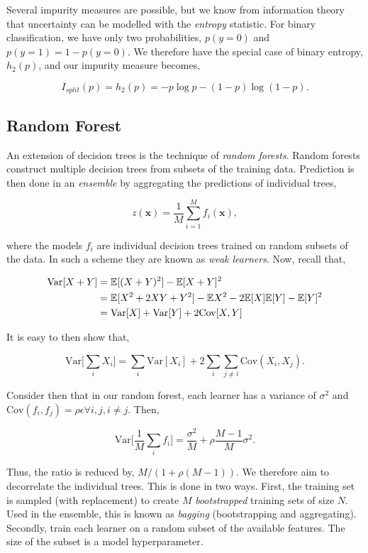 \documentclass[11pt]{amsart}
\begin{document}
Several impurity measures are possible, but we know from information theory that uncertainty can be modelled with the \emph{entropy} statistic. For binary classification, we have only two probabilities, $p(y = 0)$ and $p(y=1) = 1 - p(y=0)$. We therefore have the special case of binary entropy, $h_2(p)$, and our impurity measure becomes,

$$I_{split}(p) = h_2(p) = -p\log p - (1-p)\log (1-p).$$

\subsection{Random Forest}

An extension of decision trees is the technique of \emph{random forests}. Random forests construct multiple decision trees from subsets of the training data. Prediction is then done in an \emph{ensemble} by aggregating the predictions of individual trees,

$$z(\mathbf{x}) = \frac{1}{M}\sum_{i=1}^M f_i(\mathbf{x}),$$

where the models $f_i$ are individual decision trees trained on random subsets of the data. In such a scheme they are known as \emph{weak learners}. Now, recall that,

\begin{align}
\text{Var}[X + Y] &= \mathbb{E}[(X + Y)^2] - \mathbb{E}[X + Y]^2 \notag \\
&= \mathbb{E}[X^2 + 2XY + Y^2] - \mathbb{E}{X}^2 - 2\mathbb{E}[X]\mathbb{E}[Y] - \mathbb{E}[Y]^2 \notag \\
&= \text{Var}[X] + \text{Var}[Y] + 2\text{Cov}[X, Y] \notag
\end{align}

It is easy to then show that,

$$\text{Var}\Big[\sum_i X_i\Big] = \sum_i \text{Var}[X_i] + 2\sum_i\sum_{j \neq i} \text{Cov}(X_i, X_j).$$

Consider then that in our random forest, each learner has a variance of $\sigma^2$ and $\text{Cov}(f_i, f_j) = \rho\epsilon \forall i, j, i \neq j$. Then,

$$\text{Var}\Big[\frac{1}{M}\sum_i f_i\Big] = \frac{\sigma^2}{M} + \rho\frac{M-1}{M}\sigma^2.$$

Thus, the ratio is reduced by, $M/(1 + \rho(M-1))$. We therefore aim to decorrelate the individual trees. This is done in two ways. First, the training set is sampled (with replacement) to create $M$ \emph{bootstrapped} training sets of size $N$. Used in the ensemble, this is known as \emph{bagging} (bootstrapping and aggregating). Secondly, train each learner on a random subset of the available features. The size of the subset is a model hyperparameter.
\end{document}

